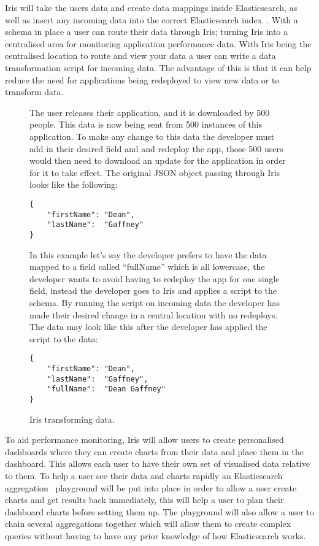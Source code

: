 \documentclass[12pt,a4paper,titlepage]{report}
\newcommand{\q}[1]{``#1''}
\begin{document}
Iris will take the users data and create data mappings 
\parencite{Elastic.co.Mapping} inside Elasticsearch, as well as insert any incoming data into the correct Elasticsearch index~\parencite{Elastic.co.Basic}. With a schema in place a user can route their data through Iris; turning Iris into a centralised area for monitoring application performance data. With Iris being the centralised location to route and view your data a user can write a data transformation script for incoming data. The advantage of this is that it can help reduce the need for applications being redeployed to view new data or to transform data.

\begin{figure}[H]
\begin{tcolorbox}

The user releases their application, and it is downloaded by 500 people. This data is now being sent from 500 instances of this application. To make any change to this data the developer must add in their desired field and and redeploy the app, those 500 users would then need to download an update for the application in order for it to take effect. The original JSON object passing through Iris looks like the following:
\begin{verbatim}
{
	"firstName": "Dean",
	"lastName":  "Gaffney"
}
\end{verbatim}

In this example let's say the developer prefers to have the data mapped to a field called \q{fullName} which is all lowercase, the developer wants to avoid having to redeploy the app for one single field, instead the developer goes to Iris and applies a script to the schema. By running the script on incoming data the developer has made their desired change in a central location with no redeploys. The data may look like this after the developer has applied the script to the data:
\begin{verbatim}
{
	"firstName": "Dean",
	"lastName":  "Gaffney",
	"fullName":  "Dean Gaffney"
}
\end{verbatim}
\end{tcolorbox}
\caption{Iris transforming data.}
\end{figure}

To aid performance monitoring, Iris will allow users to create personalised dashboards where they can create charts from their data and place them in the dashboard. This allows each user to have their own set of visualised data relative to them. To help a user see their data and charts rapidly an Elasticsearch aggregation~\parencite{Elastic.co.Aggregations} playground will be put into place in order to allow a user create charts and get results back immediately, this will help a user to plan their dashboard charts before setting them up. The playground will also allow a user to chain several aggregations together which will allow them to create complex queries without having to have any prior knowledge of how Elasticsearch works.
\end{document}
